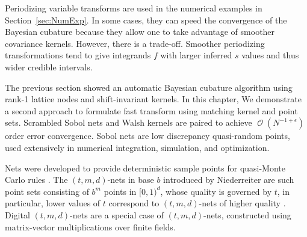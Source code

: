 \documentclass{iitthesis}          %
\DeclareMathOperator{\Order}{{\mathcal O}}
\newcommand\secref{Section~\ref}
\begin{document}
Periodizing variable transforms are used in the numerical examples in \secref{sec:NumExp}. In some cases, they can speed the convergence of the Bayesian cubature because they allow one to take advantage of smoother covariance kernels. 
However, there is a trade-off.  Smoother periodizing transformations tend to give integrands $f$ with larger inferred $s$ values and thus wider credible intervals.

































\label{sec:sobol_walsh}


The previous section showed an automatic Bayesian cubature algorithm using rank-1 lattice nodes and shift-invariant kernels. 
In this chapter, We demonstrate a second approach to formulate fast transform using matching kernel and point sets. 
Scrambled Sobol nets and Walsh kernels are paired to achieve $\Order(N^{-1 + \epsilon})$  order error convergence. 
Sobol nets \cite{Sob67} are low discrepancy quasi-random points, used extensively in numerical integration, simulation, and optimization. 



Nets were developed to provide deterministic sample points for quasi-Monte Carlo rules \cite{Nie05a}.
The $(t,m, d)$-nets in base $b$ introduced by Niederreiter are such point sets consisting of $b^m$ points in $[0, 1)^d$, whose quality is governed by $t$, in particular, lower values of $t$ correspond to $(t,m, d)$-nets of higher quality \cite{Bald10a}.
Digital $(t,m, d)$-nets are a special case of $(t,m, d)$-nets, constructed using matrix-vector multiplications over finite fields.
\end{document}
